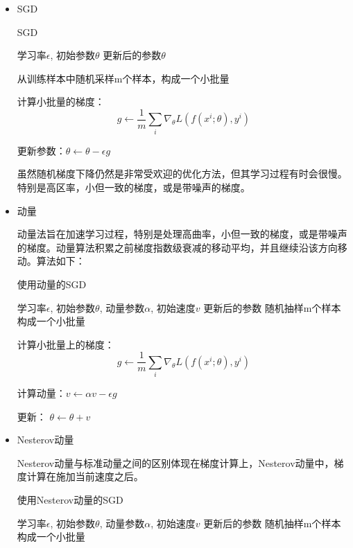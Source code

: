 \begin{itemize}
\item SGD

\begin{algorithm}
\caption{SGD}
\begin{algorithmic}[1]
\Require 学习率$\epsilon$, 初始参数$\theta$
\Ensure 更新后的参数$\theta$
\Repeat

	从训练样本中随机采样m个样本，构成一个小批量
	
	计算小批量的梯度：
	\begin{displaymath}
	g \leftarrow \frac{1}{m} \sum_{i}\nabla_{\theta}L(f(x^{i}; \theta), y^{i})
	\end{displaymath}
	
	更新参数：$\theta \leftarrow \theta - \epsilon g$
\end{algorithmic}
\end{algorithm}

虽然随机梯度下降仍然是非常受欢迎的优化方法，但其学习过程有时会很慢。特别是高区率，小但一致的梯度，或是带噪声的梯度。

\item 动量

动量法旨在加速学习过程，特别是处理高曲率，小但一致的梯度，或是带噪声的梯度。动量算法积累之前梯度指数级衰减的移动平均，并且继续沿该方向移动。算法如下：
\begin{algorithm}
\caption{使用动量的SGD}
\begin{algorithmic}
\Require 学习率$\epsilon$, 初始参数$\theta$, 动量参数$\alpha$, 初始速度$v$
\Ensure 更新后的参数
\Repeat
	随机抽样m个样本构成一个小批量
	
	计算小批量上的梯度：
	\begin{displaymath}
		g \leftarrow \frac{1}{m} \sum_{i}\nabla_{\theta}L(f(x^{i}; \theta), y^{i})
	\end{displaymath}
		
	计算动量：$v \leftarrow \alpha v - \epsilon g$
	
	更新： $\theta \leftarrow \theta + v$	
	
\end{algorithmic}
\end{algorithm}

\item Nesterov动量

Nesterov动量与标准动量之间的区别体现在梯度计算上，Nesterov动量中，梯度计算在施加当前速度之后。
\begin{algorithm}
\caption{使用Nesterov动量的SGD}
\begin{algorithmic}
\Require 学习率$\epsilon$, 初始参数$\theta$, 动量参数$\alpha$, 初始速度$v$
\Ensure 更新后的参数
\Repeat
	随机抽样m个样本构成一个小批量
	

\end{algorithmic}
\end{algorithm}
\end{itemize}
